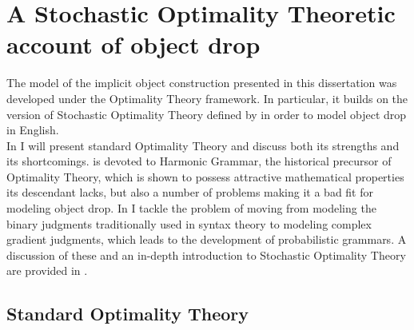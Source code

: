 \setchapterpreamble[u]{\margintoc}
\chapter{A Stochastic Optimality Theoretic account of object drop}



The model of the implicit object construction presented in this dissertation was developed under the Optimality Theory framework. In particular, it builds on the version of Stochastic Optimality Theory defined by \textcite{Medina2007} in order to model object drop in English.\\
In  I will present standard Optimality Theory and discuss both its strengths and its shortcomings.  is devoted to Harmonic Grammar, the historical precursor of Optimality Theory, which is shown to possess attractive mathematical properties its descendant lacks, but also a number of problems making it a bad fit for modeling object drop. In  I tackle the problem of moving from modeling the binary judgments traditionally used in syntax theory to modeling complex gradient judgments, which leads to the development of probabilistic grammars. A discussion of these and an in-depth introduction to Stochastic Optimality Theory are provided in .

\section{Standard Optimality Theory} 

